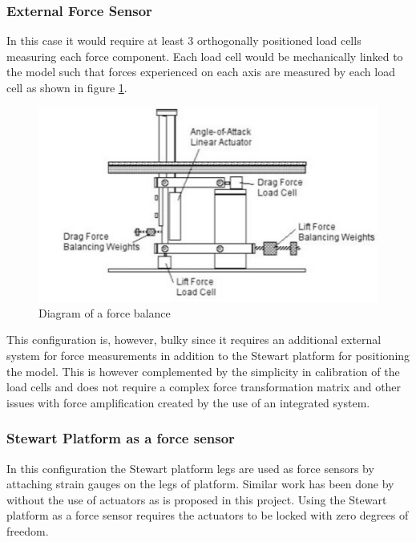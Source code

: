 \subsubsection*{External Force Sensor}
In this case it would require at least 3 orthogonally positioned load cells measuring each force component. Each load cell would be mechanically linked to the model such that forces experienced on each axis are measured by each load cell as shown in figure \ref{fig:balex}.
\begin{center}
	\begin{figure}[H]
		\centering
		\includegraphics{Figures/modBal}
		\caption[Diagram of a force balance]{Diagram of a force balance \cite{post_force_2010}}
		\label{fig:balex}
	\end{figure}
\end{center}
This configuration is, however, bulky since it requires an additional external system for force measurements in addition to the Stewart platform for positioning the model. This is however complemented by the simplicity in calibration of the load cells and does not require a complex force transformation matrix and other issues with force amplification created by the use of an integrated system.
\subsubsection*{Stewart Platform as a force sensor}
In this configuration the Stewart platform legs are used as force sensors by attaching strain gauges on the legs of platform. Similar work has been done by \cite{ferreira2015design} without the use of actuators as is proposed in this project. Using the Stewart platform as a force sensor requires the actuators to be locked with zero degrees of freedom.

